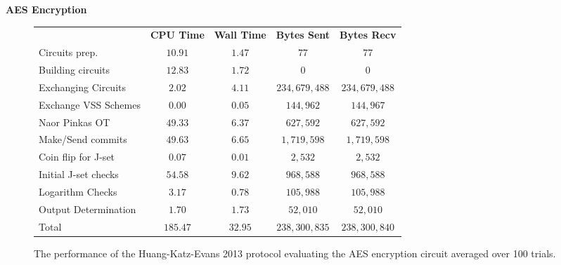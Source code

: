 \documentclass[ %
                    author={Nicholas Tutte},
                supervisor={Prof. Nigel Smart},
                    degree={MEng},
                     title={Secure Two Party Computation},
                  subtitle={A practical comparison of recent protocols},
                      type={Research - GG1K},
                      year={2015} ]{dissertation}
\begin{document}
				\FloatBarrier
				\noindent \textbf{AES Encryption}
				\begin{figure}[!ht]
					\begin{tabular}{| p{4.3cm} | c c c c |}
						\hline
						& \textbf{CPU Time} & \textbf{Wall Time} & \textbf{Bytes Sent} & \textbf{Bytes Recv} \\
						\thickhline
						Circuits prep. & $10.91$ & $1.47$ & $77$ & $77$ \\
						\hline
						Building circuits & $12.83$ & $1.72$ & $0$ & $0$ \\
						\hline
						Exchanging Circuits & $2.02$ & $4.11$ & $234,679,488$ & $234,679,488$ \\
						\hline
						Exchange VSS Schemes & $0.00$ & $0.05$ & $144,962$ & $144,967$ \\
						\hline
						Naor Pinkas OT & $49.33$ & $6.37$ & $627,592$ & $627,592$ \\
						\hline
						Make/Send commits & $49.63$ & $6.65$ & $1,719,598$ & $1,719,598$ \\
						\hline
						Coin flip for J-set & $0.07$ & $0.01$ & $2,532$ & $2,532$ \\
						\hline
						Initial J-set checks & $54.58$ & $9.62$ & $968,588$ & $968,588$ \\
						\hline
						Logarithm Checks & $3.17$ & $0.78$ & $105,988$ & $105,988$ \\
						\hline
						Output Determination & $1.70$ & $1.73$ & $52,010$ & $52,010$ \\
						\thickhline
						Total & $185.47$ & $32.95$ & $238,300,835$ & $238,300,840$ \\
						\hline
					\end{tabular}
					\caption{The performance of the Huang-Katz-Evans 2013 protocol evaluating the AES encryption circuit averaged over 100 trials.\label{table:HKE_2013_AES}}
				\end{figure}
\end{document}
